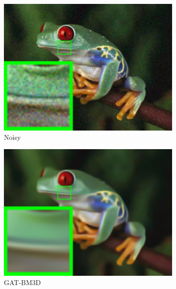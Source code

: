 \begin{figure}
    \centering
    \begin{subfigure}[t]{0.19\textwidth}
        \centering
        \includegraphics[width=1\textwidth]{images/guided/nc/resize_br_Noisy_frog.png}
		\caption{Noisy}
    \end{subfigure}
    \hfill
    \begin{subfigure}[t]{0.19\textwidth}
        \centering
        \includegraphics[width=1\textwidth]{images/guided/nc/resize_br_BM3DPoisson_frog.png}
		\caption{GAT-BM3D}
    \end{subfigure}
    \hfill
    \begin{subfigure}[t]{0.19\textwidth}
        \centering

\end{subfigure}
\end{figure}
